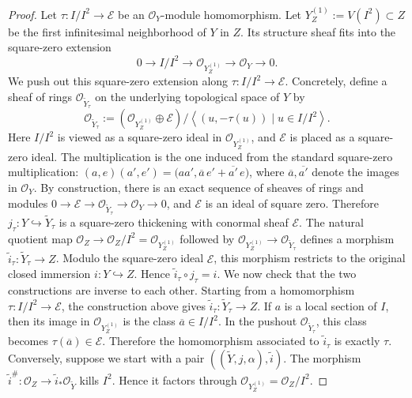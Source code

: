 \documentclass[11pt,twoside]{amsart}
\theoremstyle{plain}
\numberwithin{equation}{section}
\theoremstyle{definition}
\begin{document}
\begin{proof}
Let \(\tau:I/I^2\to\mathcal E\) be an \(\mathcal O_Y\)-module homomorphism. Let
\(Y^{(1)}_Z:=V(I^2)\subset Z\) be the first infinitesimal neighborhood of \(Y\) in \(Z\). Its structure sheaf fits into the square-zero extension
\[
    0\longrightarrow I/I^2
    \longrightarrow \mathcal O_{Y^{(1)}_Z}
    \longrightarrow \mathcal O_Y
    \longrightarrow 0.
\]
We push out this square-zero extension along \(\tau:I/I^2\to\mathcal E\). Concretely, define a sheaf of rings \(\mathcal O_{\widetilde Y_\tau}\) on the underlying topological space of \(Y\) by
\[
    \mathcal O_{\widetilde Y_\tau}
    :=
    \left(
        \mathcal O_{Y^{(1)}_Z}\oplus \mathcal E
    \right)
    \big/
    \left\langle
        (u,-\tau(u))\mid u\in I/I^2
    \right\rangle.
\]
Here \(I/I^2\) is viewed as a square-zero ideal in \(\mathcal O_{Y^{(1)}_Z}\), and
\(\mathcal E\) is placed as a square-zero ideal. The multiplication is the one induced from the standard square-zero multiplication:
\((a,e)(a',e')=\bigl(aa',\overline a\, e'+\overline{a'}\, e\bigr)\),
where \(\overline a,\overline{a'}\) denote the images in \(\mathcal O_Y\). By construction, there is an exact sequence of sheaves of rings and modules
\(0\to \mathcal E\to \mathcal O_{\widetilde Y_\tau}\to \mathcal O_Y\to 0\),
and \(\mathcal E\) is an ideal of square zero. Therefore
\(j_\tau:Y\hookrightarrow \widetilde Y_\tau\) is a square-zero thickening with conormal sheaf \(\mathcal E\). The natural quotient map \(\mathcal O_Z\to \mathcal O_Z/I^2=\mathcal O_{Y^{(1)}_Z}\) followed by \(\mathcal O_{Y^{(1)}_Z}\to \mathcal O_{\widetilde Y_\tau}\) defines a morphism \(\widetilde i_\tau:\widetilde Y_\tau\to Z\). Modulo the square-zero ideal \(\mathcal E\), this morphism restricts to the original closed immersion \(i:Y\hookrightarrow Z\). Hence \(\widetilde i_\tau\circ j_\tau=i\). We now check that the two constructions are inverse to each other.
Starting from a homomorphism \(\tau:I/I^2\to\mathcal E\), the construction above gives \(\widetilde i_\tau:\widetilde Y_\tau\to Z\). If \(a\) is a local section of \(I\), then its image in \(\mathcal O_{Y^{(1)}_Z}\) is the class \(\overline a\in I/I^2\). In the pushout \(\mathcal O_{\widetilde Y_\tau}\), this class becomes \(\tau(\overline a)\in\mathcal E\). Therefore the homomorphism associated to \(\widetilde i_\tau\) is exactly \(\tau\). Conversely, suppose we start with a pair
\(\left((\widetilde Y,j,\alpha),\widetilde i\right)\). The morphism
\(\widetilde i^\#:\mathcal O_Z\to\widetilde i_*\mathcal O_{\widetilde Y}\)
kills \(I^2\). Hence it factors through \(\mathcal O_{Y^{(1)}_Z}=\mathcal O_Z/I^2\).

\end{proof}
\end{document}

